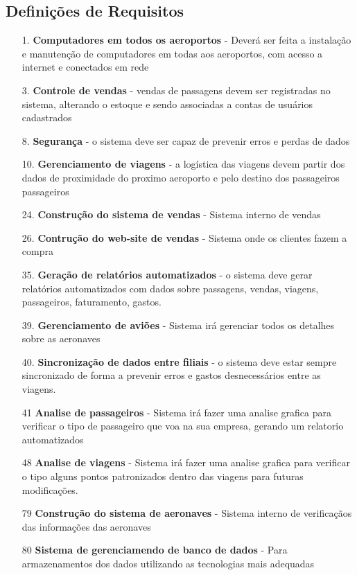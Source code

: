 \subsection{Definições de Requisitos}
\begin{enumerate}

  \item[1.] \textbf{Computadores em todos os aeroportos} - Deverá ser feita a instalação e manutenção de
        computadores em todas aos aeroportos, com acesso a internet e conectados em rede\\      
  \item[3.] \textbf{Controle de vendas} - vendas de passagens devem ser registradas no sistema, alterando
        o estoque e sendo associadas a contas de usuários cadastrados\\
  \item[8.] \textbf{Segurança} - o sistema deve ser  capaz de prevenir erros e perdas de dados\\
  \item[10.] \textbf{Gerenciamento de viagens} - a logística das viagens devem partir dos dados de
        proximidade do proximo aeroporto e pelo destino dos passageiros passageiros\\
  \item[24.] \textbf{Construção do sistema de vendas} - Sistema interno de vendas \\
  \item[26.] \textbf{Contrução do web-site de vendas} - Sistema onde os clientes fazem a compra \\
  \item[35.] \textbf{Geração de relatórios automatizados} - o sistema deve gerar relatórios automatizados
        com dados sobre passagens, vendas, viagens, passageiros, faturamento, gastos.\\
  \item[39.] \textbf{Gerenciamento de aviões} - Sistema irá gerenciar todos os detalhes sobre as aeronaves\\
  \item[40.] \textbf{Sincronização de dados entre filiais} - o sistema deve estar sempre sincronizado de
        forma a prevenir erros e gastos desnecessários entre as viagens.
  \item[41] \textbf{Analise de passageiros} - Sistema irá fazer uma analise grafica para verificar o tipo
        de passageiro que voa na sua empresa, gerando um relatorio automatizados\\
  \item[48] \textbf{Analise de viagens} - Sistema irá fazer uma analise grafica para verificar o tipo
        alguns pontos patronizados dentro das viagens para futuras modificações.\\
  \item[79] \textbf{Construção do sistema de aeronaves} - Sistema interno de verificaçãos
        das informações das aeronaves \\
  \item[80] \textbf{Sistema de gerenciamendo de banco de dados} - Para armazenamentos dos dados utilizando as tecnologias mais adequadas
\end{enumerate}


